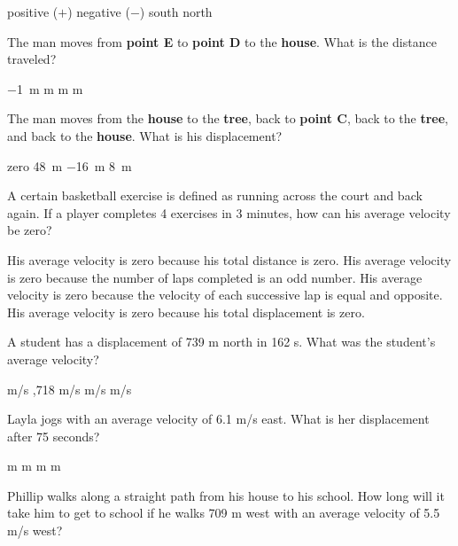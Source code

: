\documentclass[answers]{exam}
\begin{document}
\begin{questions}
\begin{questions}
\begin{choices}
\choice positive ($+$)
\CorrectChoice negative ($-$)
\choice south
\choice north
\end{choices}

\question
The man moves from \textbf{point E} to \textbf{point D} to the \textbf{house}. What is the distance traveled?

\begin{choices}
\choice \SI{-1}{m}
 m
 m
 m
\end{choices}


\question
The man moves from the \textbf{house} to the \textbf{tree}, back to \textbf{point C}, back to the \textbf{tree}, and back to the \textbf{house}. What is his displacement?

\begin{choices}
\CorrectChoice zero
\choice \SI{48}{m}
\choice \SI{-16}{m}
\choice \SI{8}{m}
\end{choices}




\question %
A certain basketball exercise is defined as running across the court and back again. If a player completes 4 exercises in 3 minutes, how can his average velocity be zero?
\begin{choices}
\choice His average velocity is zero because his total distance is zero.
\choice His average velocity is zero because the number of laps completed is an odd number.
\choice His average velocity is zero because the velocity of each successive lap is equal and opposite.
\CorrectChoice His average velocity is zero because his total displacement is zero.
\end{choices}

\question %
A student has a displacement of 739 m north in 162 s. What was the student's average velocity?

\begin{choices}
 m/s
,718 m/s
 m/s
 m/s
\end{choices}

\question %
Layla jogs with an average velocity of 6.1 m/s east. What is her displacement after 75 seconds?

\begin{choices}
 m
 m
 m
 m
\end{choices}

\question %
Phillip walks along a straight path from his house to his school. How long will it take him to get to school if he walks 709 m west with an average velocity of 5.5 m/s west?



\end{questions}
\end{questions}
\end{document}
